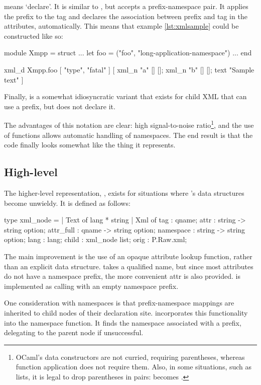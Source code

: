  means `declare'. It is similar to , but accepts a prefix-namespace pair. It applies the prefix to the tag and declares the association between prefix and tag in the attributes, automatically. This means that example \ref{lst:xmlsample} could be constructed like so:

\begin{ocaml}
module Xmpp = struct
  ...
  let foo = ("foo", "long-application-namespace")
  ...
end

xml_d Xmpp.foo [ "type", "fatal" ] [
  xml_n "a" [] [];
  xml_n "b" [] [];
  text "Sample text"
]
\end{ocaml}

Finally,  is a somewhat idiosyncratic variant that exists for child XML that can use a prefix, but does not declare it.

The advantages of this notation are clear: high signal-to-noise ratio\footnote{OCaml's data constructors are not curried, requiring parentheses, whereas function application does not require them. Also, in some situations, such as lists, it is legal to drop parentheses in pairs: \code{[ (x,y); (z,w) ]} becomes \code{[ x,y; z,w ]}.}, and the use of functions allows automatic handling of namespaces. The end result is that the code finally looks somewhat like the thing it represents.

\subsection{High-level }
The higher-level representation, , exists for situations where 's data structures become unwieldy. It is defined as follows:

\begin{ocaml}
type xml_node =
| Text of lang * string
| Xml of {
  tag    : qname;
  attr   : string -> string option;
  attr_full : qname -> string option;
  namespace : string -> string option;
  lang  : lang;
  child : xml_node list;
  orig  : P.Raw.xml;
}
\end{ocaml}

The main improvement is the use of an opaque attribute lookup function, rather than an explicit data structure.  takes a qualified name, but since most attributes do not have a namespace prefix, the more convenient attr is also provided.  is implemented as calling  with an empty namespace prefix.

One consideration with namespaces is that prefix-namespace mappings are inherited to child nodes of their declaration site.  incorporates this functionality into the namespace function. It finds the namespace associated with a prefix, delegating to the parent node if unsuccessful.

